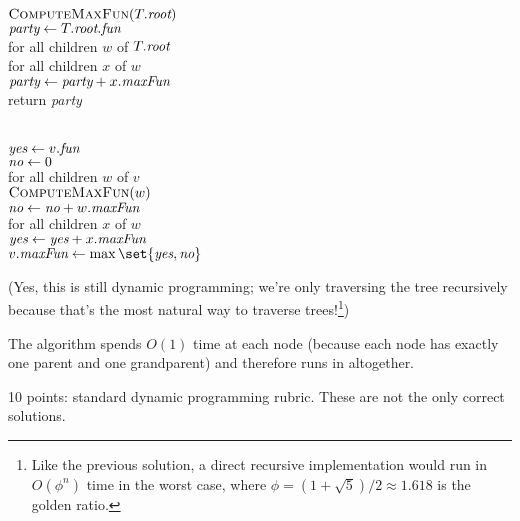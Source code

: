 \documentclass[11pt]{article}
\begin{document}
\begin{enumerate}
\begin{solution}
\begin{center}\small
\begin{algorithm}
	\+
\\	$\textsc{ComputeMaxFun}(T.\emph{root})$
\\	$\emph{party} \gets T.\emph{root}.\emph{fun}$
\\	for all children $w$ of $T.\emph{root}$\+
\\		for all children $x$ of $w$\+
\\			$\emph{party} \gets \emph{party} + x.\emph{maxFun}$\-\-
\\	return \emph{party}
\end{algorithm}
\qquad
\begin{algorithm}
	\+
\\	$\emph{yes} \gets v.\emph{fun}$
\\	$\emph{no} \gets 0$
\\	for all children $w$ of $v$\+
\\		$\textsc{ComputeMaxFun}(w)$
\\		$\emph{no} \gets \emph{no} + w.\emph{maxFun}$
\\		for all children $x$ of $w$\+
\\			$\emph{yes} \gets \emph{yes} + x.\emph{maxFun}$\-\-
\\[0.5ex]
	$v.\emph{maxFun} \gets \max\set{\emph{yes}, \emph{no}}$
\end{algorithm}
\end{center}
(Yes, this is still dynamic programming; we’re only traversing the tree recursively because that’s the most natural way to traverse trees!\footnote{Like the previous solution, a direct recursive implementation would run in $O(\phi^n)$ time in the worst case, where $\phi = (1+\sqrt{5})/2 \approx 1.618$ is the golden ratio.})

The algorithm spends $O(1)$ time at each node (because each node has exactly one parent and one grandparent) and therefore runs in  altogether.
\end{solution}

\begin{rubric}
10 points: standard dynamic programming rubric.  These are not the only correct solutions.
\end{rubric}



\end{enumerate}
\end{document}
